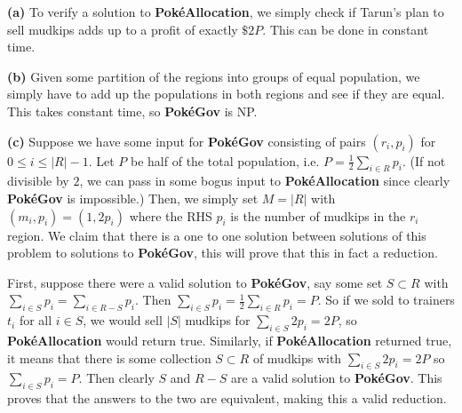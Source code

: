\documentclass[11pt,letterpaper]{article}
\begin{document}
\begin{solution}
    \textbf{(a)} To verify a solution to \textbf{Pok\'eAllocation}, we simply check if Tarun's plan to sell mudkips adds up to a profit of exactly $\$2P$. This can be done in constant time.
    
    \textbf{(b)} Given some partition of the regions into groups of equal population, we simply have to add up the populations in both regions and see if they are equal. This takes constant time, so \textbf{Pok\'eGov} is NP.
    
    \textbf{(c)} Suppose we have some input for \textbf{Pok\'eGov} consisting of pairs $(r_i, p_i)$ for $0\leq i\leq |R|-1$. Let $P$ be half of the total population, i.e. $P=\frac{1}{2}\sum_{i\in R}p_i$. (If not divisible by $2$, we can pass in some bogus input to \textbf{Pok\'eAllocation} since clearly \textbf{Pok\'eGov} is impossible.) Then, we simply set $M=|R|$ with $(m_i, p_i)=(1,2p_i)$ where the RHS $p_i$ is the number of mudkips in the $r_i$ region. We claim that there is a one to one solution between solutions of this problem to solutions to \textbf{Pok\'eGov}, this will prove that this in fact a reduction.

    First, suppose there were a valid solution to \textbf{Pok\'eGov}, say some set $S\subset R$ with $\sum_{i\in S} p_i = \sum_{i\in R-S} p_i$. Then $\sum_{i\in S} p_i = \frac{1}{2}\sum_{i\in R}p_i = P$. So if we sold to trainers $t_i$ for all $i\in S$, we would sell $|S|$ mudkips for $\sum_{i\in S}2p_i=2P$, so \textbf{Pok\'eAllocation} would return true. Similarly, if \textbf{Pok\'eAllocation} returned true, it means that there is some collection $S\subset R$ of mudkips with $\sum_{i\in S}2p_i=2P$ so $\sum_{i\in S}p_i=P$. Then clearly $S$ and $R-S$ are a valid solution to \textbf{Pok\'eGov}. This proves that the answers to the two are equivalent, making this a valid reduction.
\end{solution}
\end{document}
